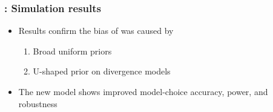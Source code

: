 \begin{frame}
    \frametitle{\dppmsbayes: Simulation results}
    \begin{itemize}
        \item Results confirm the bias of \msb was caused by

        \begin{enumerate}
            \item Broad uniform priors
            \item U-shaped prior on divergence models
        \end{enumerate}

        \item The new model shows improved model-choice accuracy, power, and
            robustness
    \end{itemize}
\end{frame}

